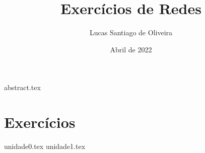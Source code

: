 \documentclass[twoside, 12pt]{article}
\title{Exercícios de Redes}
\author{Lucas Santiago de Oliveira}
\date{Abril de 2022}
\begin{document}
    \maketitle
    \tableofcontents
    {abstract.tex}

    \twocolumn %

    \section{Exercícios}
    {unidade0.tex}
    {unidade1.tex}   
    
    \printbibliography
    
\end{document}
